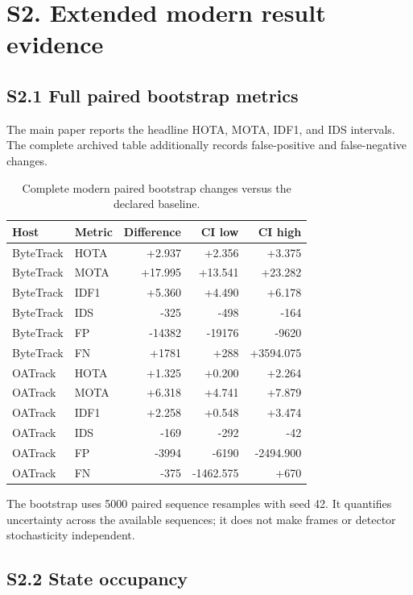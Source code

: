 \documentclass[11pt]{article}
\begin{document}
\section*{S2. Extended modern result evidence}

\subsection*{S2.1 Full paired bootstrap metrics}
The main paper reports the headline HOTA, MOTA, IDF1, and IDS intervals.
The complete archived table additionally records false-positive and
false-negative changes.

\begin{table}[ht]
\centering\scriptsize
\caption{Complete modern paired bootstrap changes versus the declared baseline.}
\label{tab:s2-bootstrap}
\begin{tabular}{llrrr}
\toprule
Host & Metric & Difference & CI low & CI high\\
\midrule
ByteTrack & HOTA & +2.937 & +2.356 & +3.375\\
ByteTrack & MOTA & +17.995 & +13.541 & +23.282\\
ByteTrack & IDF1 & +5.360 & +4.490 & +6.178\\
ByteTrack & IDS & -325 & -498 & -164\\
ByteTrack & FP & -14382 & -19176 & -9620\\
ByteTrack & FN & +1781 & +288 & +3594.075\\
OATrack & HOTA & +1.325 & +0.200 & +2.264\\
OATrack & MOTA & +6.318 & +4.741 & +7.879\\
OATrack & IDF1 & +2.258 & +0.548 & +3.474\\
OATrack & IDS & -169 & -292 & -42\\
OATrack & FP & -3994 & -6190 & -2494.900\\
OATrack & FN & -375 & -1462.575 & +670\\
\bottomrule
\end{tabular}
\end{table}

The bootstrap uses 5000 paired sequence resamples with seed 42. It quantifies
uncertainty across the available sequences; it does not make frames or
detector stochasticity independent.

\subsection*{S2.2 State occupancy}
\end{document}
